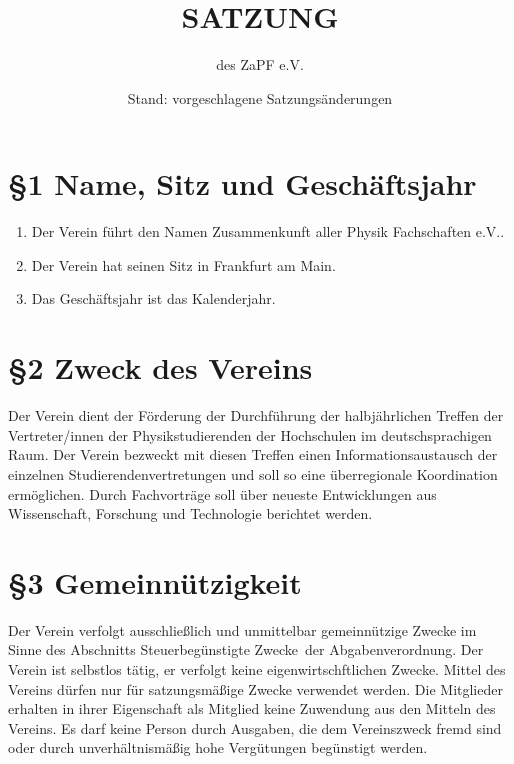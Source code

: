 \documentclass[ngerman]{article}
\begin{document}
\title{SATZUNG}
\date{Stand: vorgeschlagene Satzungsänderungen}

\author{des \textquotedbl{}ZaPF
e.V.\textquotedbl{}}

\maketitle



\section*{§1 Name, Sitz und Geschäftsjahr}
\begin{enumerate}
\item Der Verein führt den Namen \glqq Zusammenkunft aller Physik Fachschaften e.V.\grqq.
\item Der Verein hat seinen Sitz in Frankfurt am Main.
\item Das Geschäftsjahr ist das Kalenderjahr.
\end{enumerate}


\section*{§2 Zweck des Vereins}
Der Verein dient der Förderung der Durchführung der halbjährlichen Treffen der Vertreter/innen der Physikstudierenden der Hochschulen im deutschsprachigen Raum.
Der Verein bezweckt mit diesen Treffen einen Informationsaustausch der einzelnen Studierendenvertretungen und soll so eine überregionale Koordination ermöglichen. Durch Fachvorträge soll über neueste Entwicklungen aus Wissenschaft, Forschung und Technologie berichtet werden.


\section*{§3 Gemeinnützigkeit}
Der Verein verfolgt ausschließlich und unmittelbar gemeinnützige Zwecke im Sinne des Abschnitts \glqq Steuerbegünstigte Zwecke\grqq\ der Abgabenverordnung. Der Verein ist selbstlos tätig, er verfolgt keine eigenwirtschftlichen Zwecke. Mittel des Vereins dürfen nur für satzungsmäßige Zwecke verwendet werden. Die Mitglieder erhalten in
ihrer Eigenschaft als Mitglied keine Zuwendung aus den Mitteln des Vereins. Es darf keine Person durch Ausgaben, die dem Vereinszweck fremd sind oder durch unverhältnismäßig hohe Vergütungen begünstigt werden.
\end{document}
